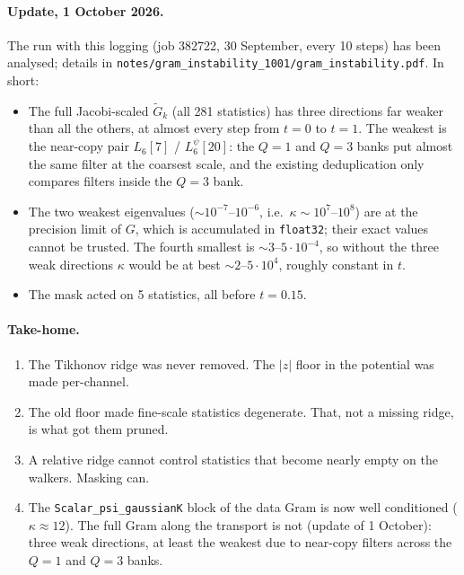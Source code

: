 \documentclass[11pt]{article}
\newcommand{\code}[1]{\texttt{#1}}
\newcommand{\Gt}{\widetilde{G}}
\begin{document}
\paragraph{Update, 1 October 2026.} The run with this logging (job 382722, 30 September, every 10
steps) has been analysed; details in \code{notes/gram\_instability\_1001/gram\_instability.pdf}.
In short:
\begin{itemize}
  \item The full Jacobi-scaled $\Gt_k$ (all 281 statistics) has three directions far weaker than
    all the others, at almost every step from $t=0$ to $t=1$. The weakest is the near-copy pair
    $L_6[7]$ / $L_6^\psi[20]$: the $Q=1$ and $Q=3$ banks put almost the same filter at the coarsest
    scale, and the existing deduplication only compares filters inside the $Q=3$ bank.
  \item The two weakest eigenvalues ($\sim10^{-7}$--$10^{-6}$, i.e.\ $\kappa\sim10^7$--$10^8$) are at
    the precision limit of $G$, which is accumulated in \code{float32}; their exact values cannot be
    trusted. The fourth smallest is $\sim3$--$5\cdot10^{-4}$, so without the three weak directions
    $\kappa$ would be at best $\sim2$--$5\cdot10^4$, roughly constant in $t$.
  \item The mask acted on 5 statistics, all before $t=0.15$.
\end{itemize}

\paragraph{Take-home.}
\begin{enumerate}
  \item The Tikhonov ridge was never removed. The $|z|$ floor in the potential was made per-channel.
  \item The old floor made fine-scale statistics degenerate. That, not a missing ridge, is what got them pruned.
  \item A relative ridge cannot control statistics that become nearly empty on the walkers. Masking can.
  \item The \code{Scalar\_psi\_gaussianK} block of the data Gram is now well conditioned ($\kappa\approx12$).
    The full Gram along the transport is not (update of 1 October): three weak directions, at least the
    weakest due to near-copy filters across the $Q=1$ and $Q=3$ banks.
\end{enumerate}
\end{document}
